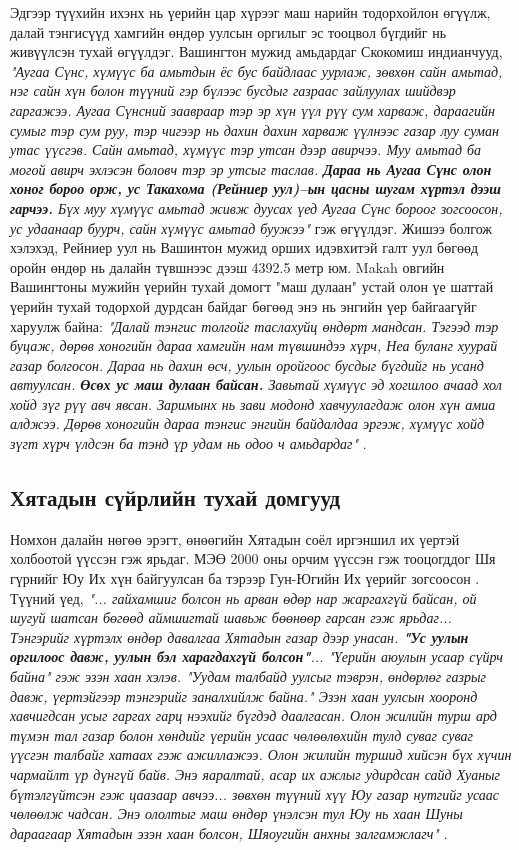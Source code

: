 \documentclass[10pt,twocolumn,letterpaper]{article}
\begin{document}
Эдгээр түүхийн ихэнх нь үерийн цар хүрээг маш нарийн тодорхойлон өгүүлж, далай тэнгисүүд хамгийн өндөр уулсын оргилыг эс тооцвол бүгдийг нь живүүлсэн тухай өгүүлдэг. Вашингтон мужид амьдардаг Скокомиш индианчууд, \textit{"Аугаа Сүнс, хүмүүс ба амьтдын ёс бус байдлаас уурлаж, зөвхөн сайн амьтад, нэг сайн хүн болон түүний гэр бүлээс бусдыг газраас зайлуулах шийдвэр гаргажээ. Аугаа Сүнсний заавраар тэр эр хүн үүл рүү сум харваж, дараагийн сумыг тэр сум руу, тэр чигээр нь дахин дахин харваж үүлнээс газар луу суман утас үүсгэв. Сайн амьтад, хүмүүс тэр утсан дээр авирчээ. Муу амьтад ба могой авирч эхлэсэн боловч тэр эр утсыг таслав. \textbf{Дараа нь Аугаа Сүнс олон хоног бороо орж, ус Такахома (Рейниер уул)–ын цасны шугам хүртэл дээш гарчээ.} Бүх муу хүмүүс амьтад живж дуусах үед Аугаа Сүнс бороог зогсоосон, ус удаанаар буурч, сайн хүмүүс амьтад буужээ"} \cite{3} гэж өгүүлдэг. Жишээ болгож хэлэхэд, Рейниер уул нь Вашинтон мужид орших идэвхитэй галт уул бөгөөд оройн өндөр нь далайн түвшнээс дээш 4392.5 метр юм.
Makah овгийн Вашингтоны мужийн үерийн тухай домогт "маш дулаан" устай олон үе шаттай үерийн тухай тодорхой дурдсан байдаг бөгөөд энэ нь энгийн үер байгаагүйг харуулж байна: \textit{"Далай тэнгис толгойг таслахуйц өндөрт мандсан. Тэгээд тэр буцаж, дөрөв хоногийн дараа хамгийн нам түвшиндээ хүрч, Неа буланг хуурай газар болгосон. Дараа нь дахин өсч, уулын оройгоос бусдыг бүгдийг нь усанд автуулсан. \textbf{Өсөх ус маш дулаан байсан.} Завьтай хүмүүс эд хогшлоо ачаад хол хойд зүг рүү авч явсан. Заримынх нь зави модонд хавчуулагдаж олон хүн амиа алджээ. Дөрөв хоногийн дараа тэнгис энгийн байдалдаа эргэж, хүмүүс хойд зүгт хүрч үлдсэн ба тэнд үр удам нь одоо ч амьдардаг"} \cite{3}.

\subsection{Хятадын сүйрлийн тухай домгууд}

Номхон далайн нөгөө эрэгт, өнөөгийн Хятадын соёл иргэншил их үертэй холбоотой үүссэн гэж ярьдаг. МЭӨ 2000 оны орчим үүссэн гэж тооцогддог Шя гүрнийг Юу Их хүн байгуулсан ба тэрээр Гун-Югийн Их үерийг зогсоосон \cite{6}. Түүний үед, \textit{"... гайхамшиг болсон нь арван өдөр нар жаргахгүй байсан, ой шугуй шатсан бөгөөд аймшигтай шавьж бөөнөөр гарсан гэж ярьдаг... Тэнгэрийг хүртэлх өндөр давалгаа Хятадын газар дээр унасан. \textbf{"Ус уулын оргилоос давж, уулын бэл харагдахгүй болсон"}... "Үерийн аюулын усаар сүйрч байна" гэж эзэн хаан хэлэв. "Уудам талбайд уулсыг тэврэн, өндөрлөг газрыг давж, үертэйгээр тэнгэрийг заналхийлж байна." Эзэн хаан уулсын хооронд хавчигдсан усыг гаргах гарц нээхийг бүгдэд даалгасан. Олон жилийн турш ард түмэн тал газар болон хөндийг үерийн усаас чөлөөлөхийн тулд суваг суваг үүсгэн талбайг хатаах гэж ажиллажээ. Олон жилийн туршид хийсэн бүх хүчин чармайлт үр дүнгүй байв. Энэ яаралтай, асар их ажлыг удирдсан сайд Хуаныг бүтэлгүйтсэн гэж цаазаар авчээ... зөвхөн түүний хүү Юу газар нутгийг усаас чөлөөлж чадсан. Энэ ололтыг маш өндөр үнэлсэн тул Юу нь хаан Шуны дараагаар Хятадын эзэн хаан болсон, Шяоугийн анхны залгамжлагч"} \cite{5}.
\end{document}
